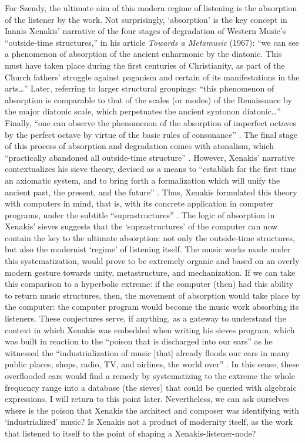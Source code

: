 For Szendy, the ultimate aim of this modern regime of listening is the absorption of the listener by the work. Not surprisingly, `absorption' is the key concept in Iannis Xenakis' narrative of the four stages of degradation of Western Music's ``outside-time structures,'' in his article \textit{Towards a Metamusic} (1967): ``we can see a phenomenon of absorption of the ancient enharmonic by the diatonic. This must have taken place during the first centuries of Christianity, as part of the Church fathers' struggle against paganism and certain of its manifestations in the arts\dots'' Later, referring to larger structural groupings: ``this phenomenon of absorption is comparable to that of the scales (or modes) of the Renaissance by the major diatonic scale, which perpetuates the ancient syntonon diatonic\dots'' Finally, ``one can observe the phenomenon of the absorption of imperfect octaves by the perfect octave by virtue of the basic rules of consonance'' \parencite[189-190]{Xen92:For}. The final stage of this process of absorption and degradation comes with atonalism, which ``practically abandoned all outside-time structure'' \parencite[193]{Xen92:For}. However, Xenakis' narrative contextualizes his sieve theory, devised as a means to ``establish for the first time an axiomatic system, and to bring forth a formalization which will unify the ancient past, the present, and the future'' \parencite[182]{Xen92:For}. Thus, Xenakis formulated this theory with computers in mind, that is, with its concrete application in computer programs, under the subtitle ``suprastructures'' \parencite[200]{Xen92:For}. The logic of absorption in Xenakis' sieves suggests that the `suprastructures' of the computer can now contain the key to the ultimate absorption: not only the outside-time structures, but also the modernist `regime' of listening itself. The music works made under this systematization, would prove to be extremely organic and based on an overly modern gesture towards unity, metastructure, and mechanization. If we can take this comparison to a hyperbolic extreme: if the computer (then) had this ability to return music structures, then, the movement of absorption would take place by the computer: the computer program would become the music work absorbing its listeners. These conjectures serve, if anything, as a gateway to understand the context in which Xenakis was embedded when writing his sieves program, which was built in reaction to the ``poison that is discharged into our ears'' as he witnessed the ``industrialization of music [that] already floods our ears in many public places, shops, radio, TV, and airlines, the world over'' \parencite[200]{Xen92:For}. In this sense, these overflooded ears would find a remedy by systematizing to the extreme the whole frequency range into a database (the sieves) that could be queried with algebraic expressions. I will return to this point later. Nevertheless, we can ask ourselves where is the poison that Xenakis the architect and composer was identifying with `industrialized' music? Is Xenakis not a product of modernity itself, as the work that listened to itself to the point of shaping a Xenakis-listener-node? 

